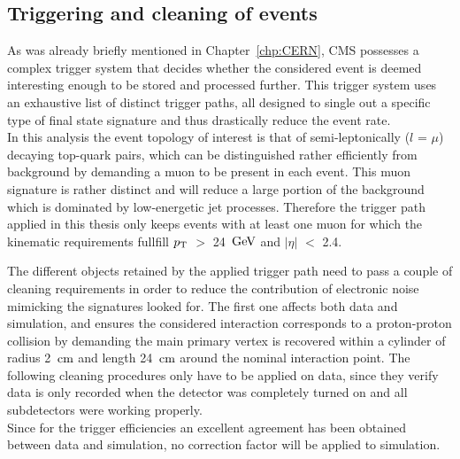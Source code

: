 \subsection{Triggering and cleaning of events}\label{subsec::Trigger}
As was already briefly mentioned in Chapter~\ref{chp:CERN}, CMS possesses a complex trigger system that decides whether the considered event is deemed interesting enough to be stored and processed further.
This trigger system uses an exhaustive list of distinct trigger paths, all designed to single out a specific type of final state signature and thus drastically reduce the event rate.
\\

In this analysis the event topology of interest is that of semi-leptonically ($l$ = $\mu$) decaying top-quark pairs, which can be distinguished rather efficiently from background by demanding a muon to be present in each event. This muon signature is rather distinct and will reduce a large portion of the background which is dominated by low-energetic jet processes.
Therefore the trigger path applied in this thesis only keeps events with at least one muon for which the kinematic requirements fullfill $p_{\rm T}$ $>$ 24 $\, \mathrm{GeV}$ and $\vert \eta \vert$ $<$ 2.4.

The different objects retained by the applied trigger path need to pass a couple of cleaning requirements in order to reduce the contribution of electronic noise mimicking the signatures looked for.
The first one affects both data and simulation, and ensures the considered interaction corresponds to a proton-proton collision by demanding the main primary vertex is recovered within a cylinder of radius 2 $\, \mathrm{cm}$ and length 24 $\, \mathrm{cm}$ around the nominal interaction point.
The following cleaning procedures only have to be applied on data, since they verify data is only recorded when the detector was completely turned on and all subdetectors were working properly.
\\

Since for the trigger efficiencies an excellent agreement has been obtained between data and simulation, no correction factor will be applied to simulation.%

